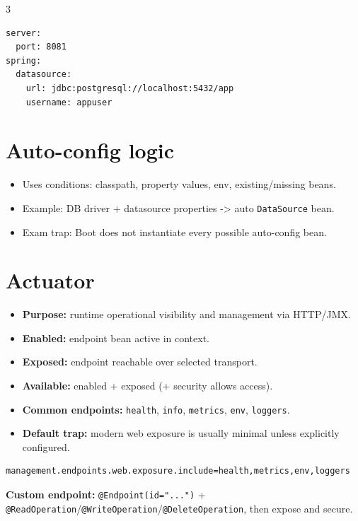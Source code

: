 \begin{multicols}{3}
\begin{lstlisting}[aboveskip=2pt,belowskip=2pt]
server:
  port: 8081
spring:
  datasource:
    url: jdbc:postgresql://localhost:5432/app
    username: appuser
\end{lstlisting}



\section*{Auto-config logic}
\begin{itemize}[leftmargin=*, nosep, topsep=0pt]
  \item Uses conditions: classpath, property values, env, existing/missing beans.
  \item Example: DB driver + datasource properties -> auto \texttt{DataSource} bean.
  \item Exam trap: Boot does not instantiate every possible auto-config bean.
\end{itemize}

\section*{Actuator}
\begin{itemize}[leftmargin=*, nosep, topsep=0pt]
  \item \textbf{Purpose:} runtime operational visibility and management via HTTP/JMX.
  \item \textbf{Enabled:} endpoint bean active in context.
  \item \textbf{Exposed:} endpoint reachable over selected transport.
  \item \textbf{Available:} enabled + exposed (+ security allows access).
  \item \textbf{Common endpoints:} \texttt{health}, \texttt{info}, \texttt{metrics}, \texttt{env}, \texttt{loggers}.
  \item \textbf{Default trap:} modern web exposure is usually minimal unless explicitly configured.
\end{itemize}

\begin{lstlisting}[aboveskip=2pt,belowskip=2pt]
management.endpoints.web.exposure.include=health,metrics,env,loggers
\end{lstlisting}

\textbf{Custom endpoint:} \texttt{@Endpoint(id="...")} + \texttt{@ReadOperation}/\texttt{@WriteOperation}/\texttt{@DeleteOperation}, then expose and secure.




\end{multicols}
